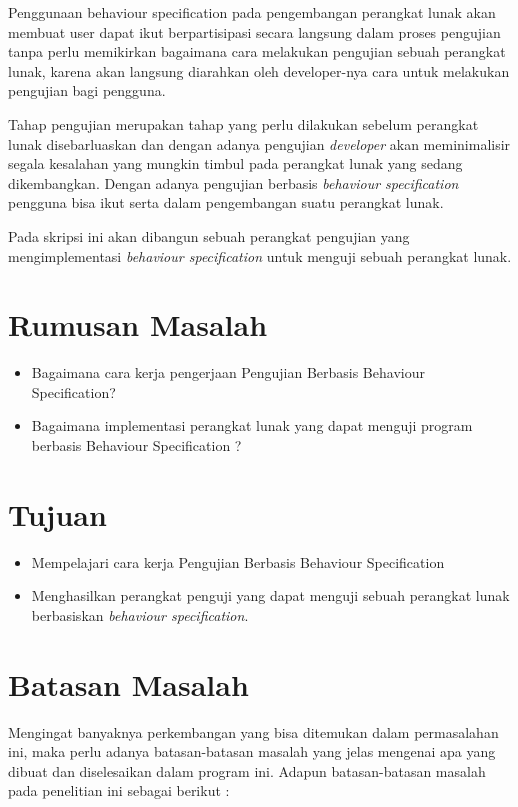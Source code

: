Penggunaan behaviour specification pada pengembangan perangkat lunak akan membuat user dapat ikut berpartisipasi secara langsung dalam proses pengujian tanpa perlu memikirkan bagaimana cara melakukan pengujian sebuah perangkat lunak, karena akan langsung diarahkan oleh developer-nya cara untuk melakukan pengujian bagi pengguna.

Tahap pengujian merupakan tahap yang perlu dilakukan sebelum perangkat lunak disebarluaskan dan dengan adanya pengujian \textit{developer} akan meminimalisir segala kesalahan yang mungkin timbul pada perangkat lunak yang sedang dikembangkan. Dengan adanya pengujian berbasis \textit{behaviour specification} pengguna bisa ikut serta dalam pengembangan suatu perangkat lunak.

Pada skripsi ini akan dibangun sebuah perangkat pengujian yang mengimplementasi \textit{behaviour specification} untuk menguji sebuah perangkat lunak.

\section{Rumusan Masalah}
\label{sec:rumusan}
\begin{itemize}
\item Bagaimana cara kerja pengerjaan Pengujian Berbasis Behaviour Specification?
\item Bagaimana implementasi perangkat lunak yang dapat menguji program berbasis Behaviour Specification ?	
\end{itemize}

\section{Tujuan}
\label{sec:tujuan}
\begin{itemize}
\item Mempelajari cara kerja Pengujian Berbasis Behaviour Specification
\item Menghasilkan perangkat penguji yang dapat menguji sebuah perangkat lunak berbasiskan \textit{behaviour specification}.
\end{itemize}

\section{Batasan Masalah}
\label{sec:batasan}
Mengingat banyaknya perkembangan yang bisa ditemukan dalam permasalahan ini, maka perlu adanya batasan-batasan masalah yang jelas mengenai apa yang dibuat dan diselesaikan dalam program ini. Adapun batasan-batasan masalah pada penelitian ini sebagai berikut :

